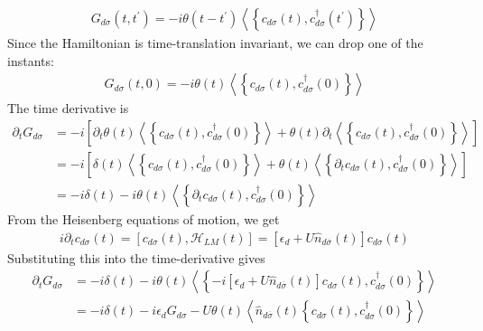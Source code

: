\documentclass[twoside,11pt]{report}
\numberwithin{equation}{section}
\begin{document}
\begin{equation}\begin{aligned}
	G_{d\sigma}(t, t^\prime) = -i\theta(t-t^\prime) \left<\left\{ c_{d\sigma}(t), c^\dagger_{d\sigma}(t^\prime) \right\} \right>
\end{aligned}\end{equation}
Since the Hamiltonian is time-translation invariant, we can drop one of the instants:
\begin{equation}\begin{aligned}
	G_{d\sigma}(t, 0) = -i\theta(t) \left<\left\{ c_{d\sigma}(t), c^\dagger_{d\sigma}(0) \right\} \right>
\end{aligned}\end{equation}
The time derivative is
\begin{equation}\begin{aligned}
	\partial_t G_{d\sigma} &= -i \left[\partial_t \theta(t) \left<\left\{ c_{d\sigma}(t), c^\dagger_{d\sigma}(0) \right\} \right> + \theta(t) \partial_t \left<\left\{ c_{d\sigma}(t), c^\dagger_{d\sigma}(0) \right\} \right>\right] \\
			       &= -i \left[\delta(t) \left<\left\{ c_{d\sigma}(t), c^\dagger_{d\sigma}(0) \right\} \right> + \theta(t) \left<\left\{ \partial_t c_{d\sigma}(t), c^\dagger_{d\sigma}(0) \right\} \right>\right]\\
			       &= -i \delta(t) -i\theta(t) \left<\left\{ \partial_t c_{d\sigma}(t), c^\dagger_{d\sigma}(0) \right\} \right>
\end{aligned}\end{equation}
From the Heisenberg equations of motion, we get
\begin{equation}\begin{aligned}
	i \partial_t c_{d\sigma}(t) = \left[c_{d\sigma}(t), \mathcal{H}_{LM}(t)\right] = \left[\epsilon_d + U \hat n_{d\overline\sigma}(t)\right]c_{d\sigma}(t)
\end{aligned}\end{equation}
Substituting this into the time-derivative gives
\begin{equation}\begin{aligned}
	\partial_t G_{d\sigma} &= -i \delta(t) -i \theta(t) \left<\left\{ -i\left[\epsilon_d + U \hat n_{d\overline\sigma}(t)\right]c_{d\sigma}(t), c^\dagger_{d\sigma}(0) \right\} \right>\\
			       &= -i \delta(t) - i\epsilon_d G_{d\sigma} - U \theta(t) \left<\hat n_{d\overline\sigma}(t)\left\{c_{d\sigma}(t), c^\dagger_{d\sigma}(0) \right\} \right>\\
\end{aligned}\end{equation}
\end{document}
